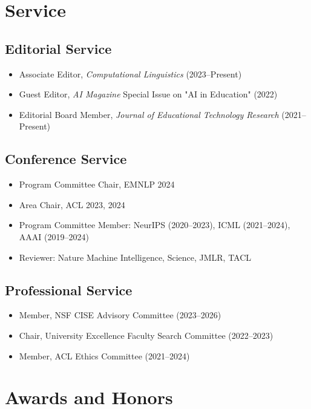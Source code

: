 \documentclass[11pt,letterpaper]{article}
\begin{document}
\section{Service}

\subsection{Editorial Service}
\begin{itemize}[noitemsep]
    \item Associate Editor, \textit{Computational Linguistics} (2023--Present)
    \item Guest Editor, \textit{AI Magazine} Special Issue on "AI in Education" (2022)
    \item Editorial Board Member, \textit{Journal of Educational Technology Research} (2021--Present)
\end{itemize}

\subsection{Conference Service}
\begin{itemize}[noitemsep]
    \item Program Committee Chair, EMNLP 2024
    \item Area Chair, ACL 2023, 2024
    \item Program Committee Member: NeurIPS (2020--2023), ICML (2021--2024), AAAI (2019--2024)
    \item Reviewer: Nature Machine Intelligence, Science, JMLR, TACL
\end{itemize}

\subsection{Professional Service}
\begin{itemize}[noitemsep]
    \item Member, NSF CISE Advisory Committee (2023--2026)
    \item Chair, University Excellence Faculty Search Committee (2022--2023)
    \item Member, ACL Ethics Committee (2021--2024)
\end{itemize}

\section{Awards and Honors}
\end{document}
